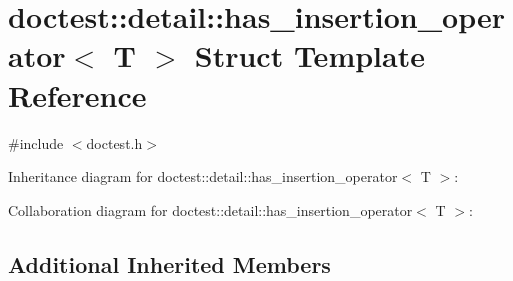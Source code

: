 \hypertarget{structdoctest_1_1detail_1_1has__insertion__operator}{}\section{doctest\+:\+:detail\+:\+:has\+\_\+insertion\+\_\+operator$<$ T $>$ Struct Template Reference}
\label{structdoctest_1_1detail_1_1has__insertion__operator}


{\ttfamily \#include $<$doctest.\+h$>$}



Inheritance diagram for doctest\+:\+:detail\+:\+:has\+\_\+insertion\+\_\+operator$<$ T $>$\+:


Collaboration diagram for doctest\+:\+:detail\+:\+:has\+\_\+insertion\+\_\+operator$<$ T $>$\+:
\subsection*{Additional Inherited Members}
